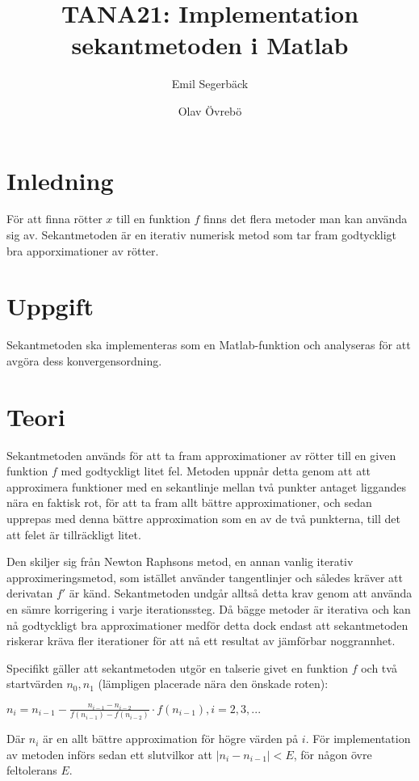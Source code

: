 \documentclass{article}
\title{TANA21: Implementation sekantmetoden i Matlab}
\author{Emil Segerbäck \and Olav Övrebö}
\begin{document}
\maketitle
\newpage

\section{Inledning}
För att finna rötter $x$ till en funktion $f$ finns det flera metoder man kan använda sig av. Sekantmetoden är en iterativ numerisk metod som tar fram godtyckligt bra apporximationer av rötter.

\section{Uppgift}
Sekantmetoden ska implementeras som en Matlab-funktion och analyseras för att avgöra dess konvergensordning.

\section{Teori}
Sekantmetoden används för att ta fram approximationer av rötter till en given funktion $f$ med godtyckligt litet fel. Metoden uppnår detta genom att att approximera funktioner med en sekantlinje mellan två punkter antaget liggandes nära en faktisk rot, för att ta fram allt bättre approximationer, och sedan upprepas med denna bättre approximation som en av de två punkterna, till det att felet är tillräckligt litet.

Den skiljer sig från Newton Raphsons metod, en annan vanlig iterativ approximeringsmetod, som istället använder tangentlinjer och således kräver att derivatan $f'$ är känd. Sekantmetoden undgår alltså detta krav genom att använda en sämre korrigering i varje iterationssteg. Då bägge metoder är iterativa och kan nå godtyckligt bra approximationer medför detta dock endast att sekantmetoden riskerar kräva fler iterationer för att nå ett resultat av jämförbar noggrannhet.

Specifikt gäller att sekantmetoden utgör en talserie givet en funktion $f$ och två startvärden $n_{0}, n_{1}$ (lämpligen placerade nära den önskade roten): 

$ n_{i} = n_{i-1} - \frac{n_{i-1} - n_{i-2}}{f(n_{i-1}) - f(n_{i-2})} \cdot f(n_{i-1}), i = 2, 3, ...$

Där $n_{i}$ är en allt bättre approximation för högre värden på $i$. För implementation av metoden införs sedan ett slutvilkor att $|n_{i} - n_{i-1}| < E$, för någon övre feltolerans $E$.
\end{document}
